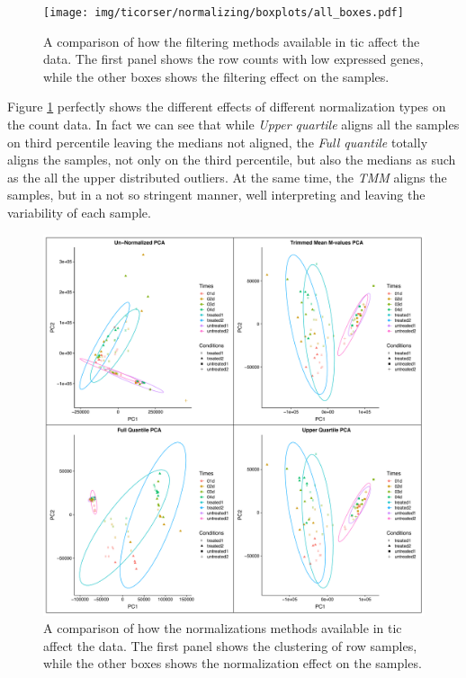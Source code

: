 \begin{figure}[H]
\texttt{[image: img/ticorser/normalizing/boxplots/all\_boxes.pdf]}
\caption[ticorser normalizing methods]{A comparison of how the filtering methods available in \gls{tic} affect the data.
The first panel shows the row counts with low expressed genes, while the other boxes shows the filtering effect on the samples.}
\label{fig:ticorsernormalizingbox}
\centering
\end{figure}

Figure \ref{fig:ticorsernormalizingbox} perfectly shows the different effects of different normalization types on the count data.  
In fact we can see that while \textit{Upper quartile} aligns all the samples on third percentile leaving the medians not aligned, the \textit{Full quantile} totally aligns the samples, not only on the third percentile, but also the medians as such as the all the upper distributed outliers.
At the same time, the \textit{TMM} aligns the samples, but in a not so stringent manner, well interpreting and leaving the variability of each sample.

\begin{figure}[H]
\includegraphics[width=\textwidth,height=\textheight,keepaspectratio]{img/ticorser/normalizing/pca/all_pca.pdf}
\caption[ticorser normalizing methods]{A comparison of how the normalizations methods available in \gls{tic} affect the data.
The first panel shows the clustering of row samples, while the other boxes shows the normalization effect on the samples.}
\label{fig:ticorsernormalizingpca}
\centering
\end{figure}

